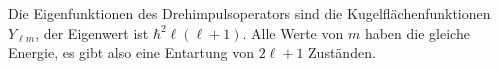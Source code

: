 Die Eigenfunktionen des Drehimpulsoperators sind die Kugelflächenfunktionen
$Y_{\ell m}$, der Eigenwert ist $\hbar^2 \ell(\ell+1)$. Alle Werte von $m$
haben die gleiche Energie, es gibt also eine Entartung von $2\ell+1$ Zuständen.


\IfFileExists{\bibliographyfile}{
}{}



